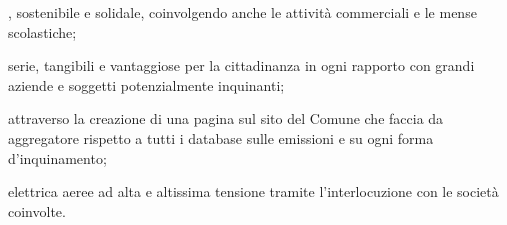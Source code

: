 , sostenibile e solidale, coinvolgendo anche le attività commerciali e le mense scolastiche;

 serie, tangibili e vantaggiose per la cittadinanza in ogni rapporto con grandi aziende e soggetti potenzialmente inquinanti;

 attraverso la creazione di una pagina sul sito del Comune che faccia da aggregatore rispetto a tutti i database sulle emissioni e su ogni forma d'inquinamento;

 elettrica aeree ad alta e altissima tensione tramite l'interlocuzione con le società coinvolte.
